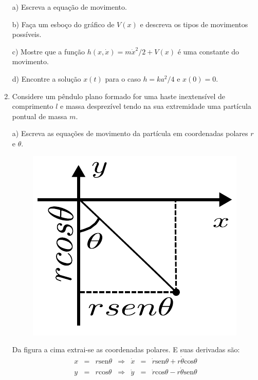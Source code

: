 \begin{enumerate}[start=1,label={\bfseries Q\arabic*.}]
a) Escreva a equação de movimento.

\resposta

b) Faça um esboço do gráfico de $V (x)$ e descreva os tipos de movimentos possíveis.

\resposta

c) Mostre que a função $h(x, \dot{x}) = m\dot{x}^{2} / 2 + V (x)$ é uma constante do movimento.

\resposta

d) Encontre a solução $x(t)$ para o caso $h = k a^{2} / 4$ e $x(0) = 0$.

\resposta



\item Considere um pêndulo plano formado for uma haste inextensível de comprimento $l$ e massa desprezível tendo na sua extremidade uma partícula pontual de massa $m$.

a) Escreva as equações de movimento da partícula em coordenadas polares $r$ e $\theta$.

\resposta

\begin{figure}[H]
\centering
\includegraphics[scale=0.4]{classica-img/pendulo1.pdf}
\end{figure}

Da figura a cima  extrai-se as coordenadas polares. E suas derivadas são:
$$
\begin{array}{ccccccc}
x & = & r \mathrm{sen} \theta & \Rightarrow & \dot{x} & = & \dot{r} \mathrm{sen} \theta + r \dot{\theta} \mathrm{cos} \theta \\
y & = & r \mathrm{cos} \theta & \Rightarrow & \dot{y} & = & \dot{r} \mathrm{cos} \theta - r \dot{\theta} \mathrm{sen} \theta
\end{array}
$$


\end{enumerate}
